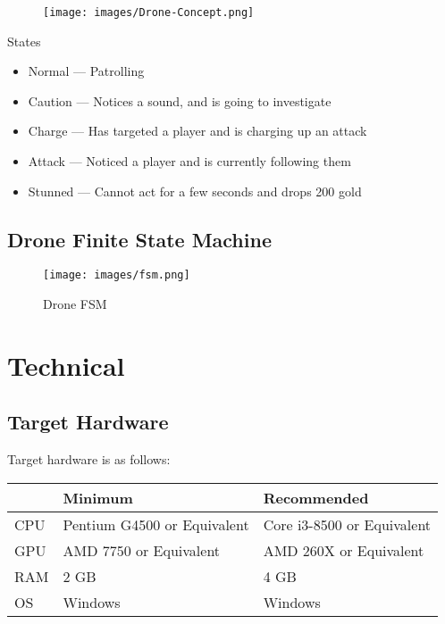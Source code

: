 \documentclass[10pt]{report}
\begin{document}
\begin{figure}[H]
    \centering
    \texttt{[image: images/Drone-Concept.png]}
    \caption{}
\end{figure}

States

\begin{itemize}
    \item Normal --- Patrolling
    \item Caution --- Notices a sound, and is going to investigate
    \item Charge --- Has targeted a player and is charging up an attack
    \item Attack --- Noticed a player and is currently following them
    \item Stunned --- Cannot act for a few seconds and drops 200 gold
\end{itemize}

\section{Drone Finite State Machine}

\begin{figure}[H]
    \centering
	\texttt{[image: images/fsm.png]}
	\caption{Drone FSM}
\end{figure}

\chapter{Technical}

\section{Target Hardware}

Target hardware is as follows:

\begin{center}
    \begin{tabular}{|l|l|l|}
        \hline
        & Minimum & Recommended \\ \hline
        CPU & Pentium G4500 or Equivalent & Core i3-8500 or Equivalent \\ \hline
        GPU & AMD 7750 or Equivalent & AMD 260X or Equivalent \\ \hline
        RAM & 2 GB & 4 GB \\ \hline
        OS & Windows & Windows \\
        \hline
    \end{tabular}
\end{center}
\end{document}
